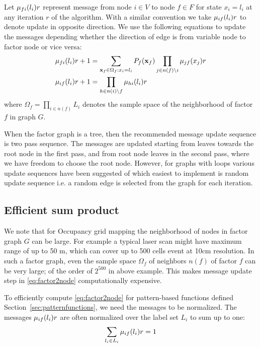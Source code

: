 \documentclass[letterpaper, 10 pt, conference]{ieeeconf} %
\newcommand{\vect}[1]{\mathbf{#1}}
\begin{document}
Let $\mu_{fi}(l_i){r}$ represent message from
node $i \in V$ to node $f \in F$ for state $x_i = l_i$ at any iteration $r$ of the
algorithm. With a similar convention we take $\mu_{if}(l_i){r}$ to denote
update in opposite direction. We use the following equations to update the messages depending whether the direction of edge is from variable node to factor node or vice versa:
\begin{align}
  \msg{f}{i}{l_i}{r+1} &= \sum_{\vect{x}_f \in \Omega_f: x_i = l_i}P_f(\vect{x}_f)\prod_{j \in n(f) \setminus i}\msg{j}{f}{x_j}{r}
  \label{eq:factor2node}
  \\
  \msg{i}{f}{l_i}{r+1} &= \prod_{h \in n(i) \setminus f}\msg{h}{i}{l_i}{r}
  \label{eq:node2factor}
\end{align}
where $\Omega_f = \prod_{i \in n(f)} L_i$ denotes the sample space of the neighborhood of factor $f$ in graph $G$.

When the factor graph is a tree, then the recommended message update sequence
is two pass sequence. The messages are updated starting from leaves towards the
root node in the first pass, and from root node leaves in the second pass,
where we have freedom to choose the root node. However, for graphs with loops
various update sequences have been suggested of which easiest to implement is
random update sequence i.e. a random edge is selected from the graph for each iteration.

\subsection{Efficient sum product}
We note that for Occupancy grid mapping the neighborhood of nodes in factor
graph $G$ can be large. For example a typical laser scan might have maximum
range of up to 50 m, which can cover up to 500 cells event at 10cm resolution.
In such a factor graph, even the sample space $\Omega_f$ of neighbors
$n(f)$ of factor $f$ can be very large; of the order of $2^{500}$  in above
example. This makes message update step in \eqref{eq:factor2node}
computationally expensive.

To efficiently compute \eqref{eq:factor2node} for pattern-based functions defined Section~\ref{sec:patternfunctions}, we need the messages to be normalized. The messages $\mu_{if}(l_i){r}$ are often normalized over the label set $L_i$ to sum up to one:
\begin{align}
  \sum_{l_i \in L_i} \mu_{if}(l_i){r} = 1
\end{align}
\end{document}
